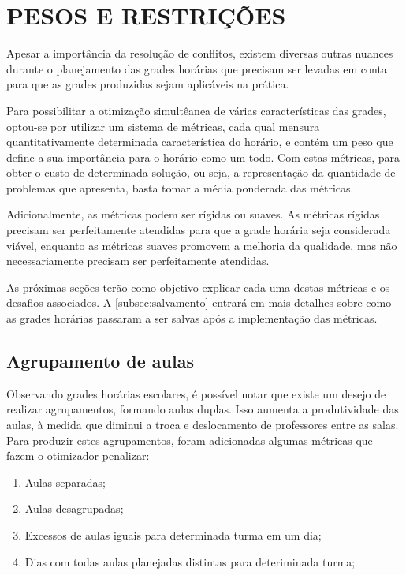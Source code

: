 \section{PESOS E RESTRIÇÕES}

Apesar a importância da resolução de conflitos, existem diversas outras nuances durante o planejamento das grades horárias que precisam ser levadas em conta para que as grades produzidas sejam aplicáveis na prática.

Para possibilitar a otimização simultêanea de várias características das grades, optou-se por utilizar um sistema de métricas, cada qual mensura quantitativamente determinada característica do horário, e contém um peso que define a sua importância para o horário como um todo. Com estas métricas, para obter o custo de determinada solução, ou seja, a representação da quantidade de problemas que apresenta, basta tomar a média ponderada das métricas. 

Adicionalmente, as métricas podem ser rígidas ou suaves. As métricas rígidas precisam ser perfeitamente atendidas para que a grade horária seja considerada viável, enquanto as métricas suaves promovem a melhoria da qualidade, mas não necessariamente precisam ser perfeitamente atendidas.

As próximas seções terão como objetivo explicar cada uma destas métricas e os desafios associados. A \autoref{subsec:salvamento} entrará em mais detalhes sobre como as grades horárias passaram a ser salvas após a implementação das métricas.

\subsection{Agrupamento de aulas}

Observando grades horárias escolares, é possível notar que existe um desejo de realizar agrupamentos, formando aulas duplas. Isso aumenta a produtividade das aulas, à medida que diminui a troca e deslocamento de professores entre as salas. Para produzir estes agrupamentos, foram adicionadas algumas métricas que fazem o otimizador penalizar:

\begin{enumerate}
	\item Aulas separadas;
	\item Aulas desagrupadas;
	\item Excessos de aulas iguais para determinada turma em um dia;
	\item Dias com todas aulas planejadas distintas para deteriminada turma;
\end{enumerate}

